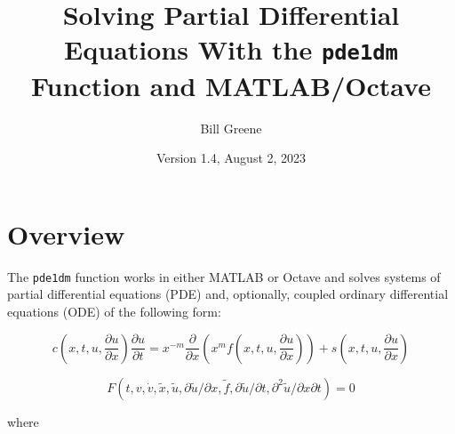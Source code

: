 \documentclass{article}
\begin{document}
\newcommand{\pde}{ {\tt pde1dm} }
\newcommand{\ml}{ {\tt MATLAB} }
\newcommand{\pdepe}{ {\tt pdepe} }
\newcommand{\exdir}{c:/wgreene/scripts/matlab/pde1dM/documents/}
\newcommand{\mylisting}[1]{}
\newcommand{\pux}{\frac{\partial u}{\partial x}}
\newcommand{\mycode}[1]{{\tt #1}}


\title{Solving Partial Differential Equations With the \pde Function and MATLAB/Octave}
\author{Bill Greene}
\date{Version 1.4, August 2, 2023}
\maketitle

\tableofcontents
\newpage

\section{Overview}
The \pde function works in either MATLAB or Octave and solves systems of partial differential equations (PDE) and, optionally,
coupled ordinary differential equations (ODE) of the following form:

\begin{equation}\label{eq:pde}
c(x, t,u,\pux{})\frac{\partial u}{\partial t} = x^{-m} \frac{\partial}{\partial x}
\left(x^m f(x, t,u,\pux )\right) +  s(x, t,u,\pux ) 
\end{equation}

\begin{equation}\label{eq:ode}
F(t,v,\dot v,\tilde x, \tilde u, \partial \tilde u/\partial x, \tilde f,  \partial\tilde u/\partial t,  \partial^2\tilde u/\partial x\partial t) = 0
\end{equation}

where
\end{document}
